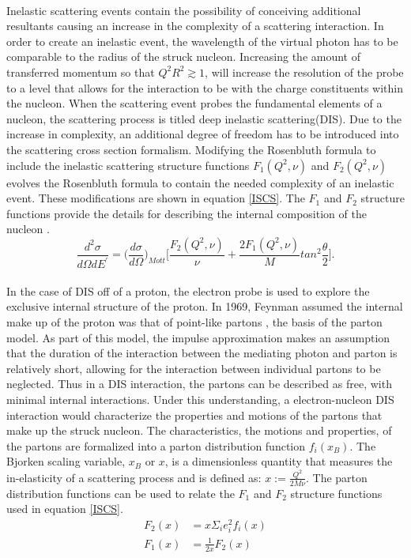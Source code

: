 \paragraph{}Inelastic scattering events contain the possibility of conceiving additional resultants causing an increase in the complexity of a scattering interaction. In order to create an inelastic event, the wavelength of the virtual photon has to be comparable to the radius of the struck nucleon. Increasing the amount of transferred momentum so that $Q^2R^2 \gtrsim 1$, will increase the resolution of the probe to a level that allows for the interaction to be with the charge constituents within the nucleon. When the scattering event probes the fundamental elements of a nucleon, the scattering process is titled deep inelastic scattering(DIS). Due to the increase in complexity, an additional degree of freedom has to be introduced into the scattering cross section formalism. Modifying the Rosenbluth formula to include the inelastic scattering structure functions $F_1(Q^2,\nu)$ and $F_2(Q^2,\nu)$ evolves the Rosenbluth formula to contain the needed complexity of an inelastic event. These modifications are shown in equation \ref{ISCS}. The $F_1$ and $F_2$ structure functions provide the details for describing the internal composition of the nucleon \cite{PnN}. 
\begin{equation}
\label{ISCS}
\frac{d^2\sigma}{d\Omega dE^\prime}=\bigg(\frac{d\sigma}{d\Omega}\bigg)_{Mott} \bigg\lbrack \frac{F_2(Q^2,\nu)}{\nu} + \frac{2F_1(Q^2,\nu)}{M}tan^2\frac{\theta}{2} \bigg \rbrack.
\end{equation}  
\paragraph{}In the case of DIS off of a proton, the electron probe is used to explore the exclusive internal structure of the proton. In 1969, Feynman assumed the internal make up of the proton was that of point-like partons \cite{Briskin_thesis,DISproton}, the basis of the parton model. As part of this model, the impulse approximation makes an assumption that the duration of the interaction between the mediating photon and parton is relatively short, allowing for the interaction between individual partons to be neglected. Thus in a DIS interaction, the partons can be described as free, with minimal internal interactions. Under this understanding, a electron-nucleon DIS interaction would characterize the properties and motions of the partons that make up the struck nucleon\cite{DISproton}. The characteristics, the motions and properties, of the partons are formalized into a parton distribution function $f_i(x_B)$. The Bjorken scaling variable, $x_B$ or $x$, is a dimensionless quantity that measures the in-elasticity of a scattering process and is defined as: $x := \frac{Q^2}{2M\nu}$. The parton distribution functions can be used to relate the $F_1$ and $F_2$ structure functions used in equation \ref{ISCS}.
\begin{align}
\label{PDFs}
F_2(x) &= x \Sigma_i e^2_i f_i(x)\\
F_1(x) &= \frac{1}{2x} F_2(x) \nonumber
\end{align}
